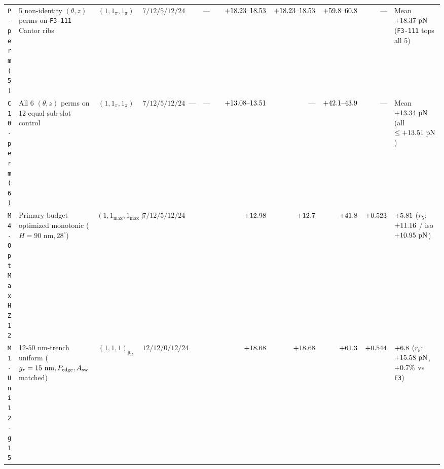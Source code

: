 \begin{table}[!htbp]
{\begin{tabular}{llccrrrrrrrrl}
\texttt{P-perm(5)} & 5 non-identity $(\theta,z)$ perms on \texttt{F3-111} Cantor ribs & $(1,1_\pi,1_\pi)$ & $7 / 12 / 5 / 12 / 24$ & \roundfour{\NthreeUnithreedFoneoneoneUnifiedAreaUmtwo} & \roundtwo{\NthreeUnithreedFoneoneoneUnifiedPedgeUm} & --- & \roundone{\NthreeUnithreedFoneoneoneUnifiedGrHarmNm} & $+\roundtwo{\NthreePermCantorMinFzPn}\text{--}\roundtwo{\NthreePermCantorMaxFzPn}$ & $+\roundtwo{\NthreePermCantorMinFzPn}\text{--}\roundtwo{\NthreePermCantorMaxFzPn}$ & $+\roundone{\NthreePermPPermthreetwooneFa}\text{--}\roundone{\NthreePermPPermonethreetwoFa}$ & --- & Mean $+\roundtwo{\NthreePermCantorMeanFzPn}\text{ pN}$ (\texttt{F3-111} tops all 5) \\
\texttt{C10-perm(6)} & All 6 $(\theta,z)$ perms on 12-equal-sub-slot control & $(1,1_\pi,1_\pi)$ & $7 / 12 / 5 / 12 / 24$ & \roundfour{\NthreeUnithreedCtrlOutphaseonetwoAreaUmtwo} & --- & --- & \roundone{\NthreeUnithreedCtrlOutphaseonetwoGrHarmNm} & $+\roundtwo{\NthreePermConezeroMinFzPn}\text{--}\roundtwo{\NthreePermConezeroMaxFzPn}$ & --- & $+\roundone{\NthreePermConezeroPermthreetwooneFa}\text{--}\roundone{\NthreePermConezeroPermonetwothreeFa}$ & --- & Mean $+\roundtwo{\NthreePermConezeroMeanFzPn}\text{ pN}$ (all $\le +\roundtwo{\NthreePermConezeroMaxFzPn}\text{ pN}$) \\
\texttt{M4-OptMaxHZ12} & Primary-budget optimized monotonic ($H=90\text{ nm}, 28^\circ$) & $(1,1_{\max},1_{\max})$ & $7 / 12 / 5 / 12 / 24$ & \roundfour{\NthreeOptMfourOptmaxhzonetwoAreaUmtwo} & \roundtwo{\NthreeOptMfourOptmaxhzonetwoPedgeUm} & \roundtwo{\NthreeOptMfourOptmaxhzonetwoAswUmtwo} & \roundone{\NthreeOptMfourOptmaxhzonetwoGrHarmNm} & $+\roundtwo{\NthreeOptMfourOptmaxhzonetwoFzPn}$ & $+\roundtwo{\NthreeOptMfourOptmaxhzonetwoIsofthreeFzPn}$ & $+\roundone{\NthreeOptMfourOptmaxhzonetwoFa}$ & $+\roundthree{\NthreeOptMfourOptmaxhzonetwoFp}$ & $+\roundtwo{\NthreeOptMfourOptmaxhzonetwoFasw}$ ($r_5$: $+\roundtwo{\NthreeOptMfourOptmaxhzonetwoRfivenmFzPn}$ / iso $+\roundtwo{\NthreeOptMfourOptmaxhzonetwoIsofthreeRfivenmFzPn}\text{ pN}$) \\
\texttt{M1-Uni12-g15} & 12-$50\text{ nm}$-trench uniform ($g_r=15\text{ nm}, P_{\rm edge}, A_{\rm sw}$ matched) & $(1,1,1)_{g_{15}}$ & $12 / 12 / 0 / 12 / 24$ & \roundfour{\NthreeOptMoneUnionetwoGonefiveAreaUmtwo} & \roundtwo{\NthreeOptMoneUnionetwoGonefivePedgeUm} & \roundtwo{\NthreeOptMoneUnionetwoGonefiveAswUmtwo} & \roundone{\NthreeOptMoneUnionetwoGonefiveGrHarmNm} & $+\roundtwo{\NthreeOptMoneUnionetwoGonefiveFzPn}$ & $+\roundtwo{\NthreeOptMoneUnionetwoGonefiveFzPn}$ & $+\roundone{\NthreeOptMoneUnionetwoGonefiveFa}$ & $+\roundthree{\NthreeOptMoneUnionetwoGonefiveFp}$ & $+\roundtwo{\NthreeOptMoneUnionetwoGonefiveFasw}$ ($r_5$: $+\roundtwo{\NthreeOptMoneUnionetwoGonefiveRfivenmFzPn}\text{ pN}$, $+\roundone{\NthreeOptDiffMoneUnionetwoGonefiveVsFoneoneonePct}\%$ vs \texttt{F3}) \\

\end{tabular}}
\end{table}
